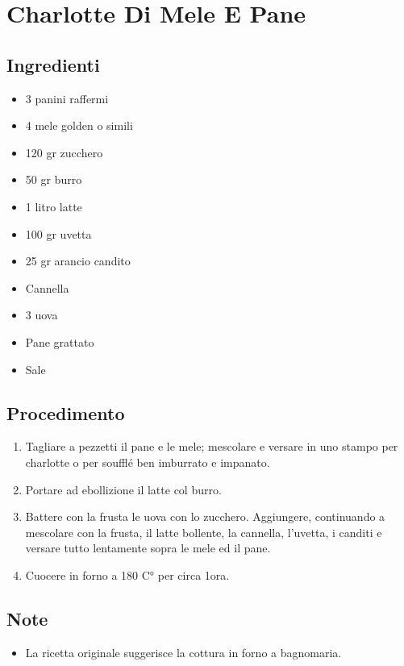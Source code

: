 \section{Charlotte Di Mele E Pane}
\subsection{Ingredienti}
\begin{itemize}
\item 3 panini raffermi  
\item 4 mele golden o simili  
\item 120 gr zucchero  
\item 50 gr burro  
\item 1 litro latte  
\item 100 gr uvetta  
\item 25 gr arancio candito  
\item Cannella  
\item 3 uova  
\item Pane grattato  
\item Sale
\end{itemize}
\subsection{Procedimento}
\begin{enumerate}
\item  Tagliare a pezzetti il pane e le mele; mescolare e versare in uno stampo per charlotte o per soufflé ben imburrato e impanato.  
\item  Portare ad ebollizione il latte col burro.  
\item  Battere con la frusta le uova con lo zucchero. Aggiungere, continuando a mescolare con la frusta, il latte bollente, la cannella, l'uvetta, i canditi e versare tutto lentamente sopra le mele ed il pane.   
\item  Cuocere in forno a 180 C° per circa 1ora.
\end{enumerate}
\subsection{Note}
\begin{itemize}
\item La ricetta originale suggerisce la cottura in forno a bagnomaria.
\end{itemize}
